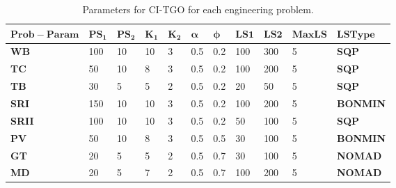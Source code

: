 
\begin{table*}[tp]
    \tiny
\begin{center}
\begin{tabular}{ | P{0.8cm} | P{0.8cm} | P{0.8cm} | P{0.8cm} | P{0.8cm} | P{0.8cm} | P{0.8cm} | P{0.8cm} | P{0.8cm} | P{0.8cm} | P{0.8cm}  | }
\hline
$\bm{Prob-Param}$ & $\bm{PS_1}$ & $\bm{PS_2}$ & $\bm{K_1}$ & $\bm{K_2}$ & $\bm{\alpha}$ & $\bm{\phi}$ & $\bm{LS1}$ & $\bm{LS2}$ & $\bm{MaxLS}$ & $\bm{LSType}$ \\
\hline

\textbf{WB} & 100 & 10 & 10 & 3 & 0.5 & 0.2 & 100 & 300 & 5 & \textbf{SQP} \\
\textbf{TC} & 50 & 10 & 8 & 3 & 0.5 & 0.2 & 100 & 200 & 5 & \textbf{SQP} \\
\textbf{TB} & 30 & 5 & 5 & 2 & 0.5 & 0.2 & 20 & 50 & 5 & \textbf{SQP} \\
\textbf{SRI} & 150 & 10 & 10 & 3 & 0.5 & 0.2 & 100 & 200 & 5 & \textbf{BONMIN} \\
\textbf{SRII} & 100 & 10 & 10 & 3 & 0.5 & 0.2 & 50 & 100 & 5 & \textbf{SQP} \\
\textbf{PV} & 50 & 10 & 8 & 3 & 0.5 & 0.5 & 30 & 100 & 5 & \textbf{BONMIN} \\
\textbf{GT} & 20 & 5 & 5 & 2 & 0.5 & 0.7 & 30 & 100 & 5 & \textbf{NOMAD} \\
\textbf{MD} & 20 & 5 & 7 & 2 & 0.5 & 0.7 & 100 & 200 & 5 & \textbf{NOMAD} \\
\hline

\end{tabular}
\end{center}

\caption{ Parameters for CI-TGO for each engineering problem. \\[1em]}
\label{tab:Parameters}
\end{table*}

